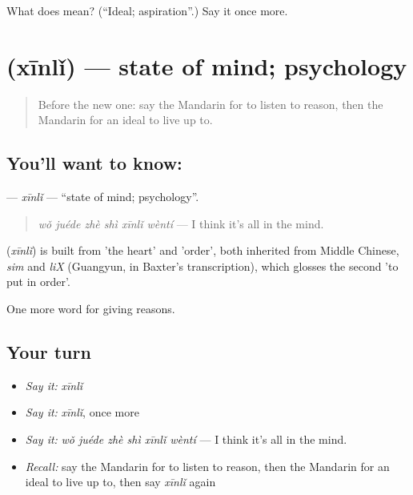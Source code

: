 \begin{tcolorbox}[breakable,colback=teal!4,colframe=teal!35!black,title={Before you move on}]
What does  mean? (\textquotedblleft{}Ideal; aspiration\textquotedblright{}.) Say it once more.
\end{tcolorbox}
\section[\texorpdfstring{\zh{心理} (xīnlǐ)}{心理 (xīnlǐ)}]{ (xīnlǐ) — state of mind; psychology}

\label{lesson:ZH-C351-xinli}



\begin{quote}
Before the new one: say the Mandarin for to listen to reason, then the Mandarin for an ideal to live up to.
\end{quote}

\subsection*{You'll want to know: }
\textbf{} — \emph{xīnlǐ} — \textquotedblleft{}state of mind; psychology\textquotedblright{}.

\begin{quote}
\emph{wǒ juéde zhè shì xīnlǐ wèntí} — I think it's all in the mind.
\end{quote}

\begin{cousinweb}
\textbf{} (\emph{xīnlǐ}) is built from  'the heart' and  'order', both inherited from Middle Chinese, \emph{sim} and \emph{liX} (Guangyun, in Baxter's transcription), which glosses the second 'to put in order'.
\end{cousinweb}

\begin{grammarlens}[title={What you've built}]
One more word for giving reasons.
\end{grammarlens}

\subsection*{Your turn}
\begin{itemize}
\raggedright
  \item \emph{Say it:} \emph{xīnlǐ}
  \item \emph{Say it:} \emph{xīnlǐ}, once more
  \item \emph{Say it:} \emph{wǒ juéde zhè shì xīnlǐ wèntí} — I think it's all in the mind.
  \item \emph{Recall:} say the Mandarin for to listen to reason, then the Mandarin for an ideal to live up to, then say \emph{xīnlǐ} again
\end{itemize}

